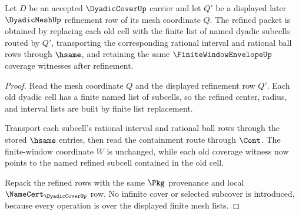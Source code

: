 \begin{theorem}
\label{thm:dyadic-cover-finite-refinement}
Let $D$ be an accepted $\DyadicCoverUp$ carrier and let $Q'$ be a displayed
later $\DyadicMeshUp$ refinement row of its mesh coordinate $Q$. The refined
packet is obtained by replacing each old cell with the finite list of named
dyadic subcells routed by $Q'$, transporting the corresponding rational
interval and rational ball rows through $\hsame$, and retaining the same
$\FiniteWindowEnvelopeUp$ coverage witnesses after refinement.
\end{theorem}
\begin{proof}
Read the mesh coordinate $Q$ and the displayed refinement row $Q'$. Each old
dyadic cell has a finite named list of subcells, so the refined center, radius,
and interval lists are built by finite list replacement.

Transport each subcell's rational interval and rational ball rows through the
stored $\hsame$ entries, then read the containment route through $\Cont$. The
finite-window coordinate $W$ is unchanged, while each old coverage witness now
points to the named refined subcell contained in the old cell.

Repack the refined rows with the same $\Pkg$ provenance and local
$\NameCert_{\DyadicCoverUp}$ row. No infinite cover or selected subcover is
introduced, because every operation is over the displayed finite mesh lists.
\end{proof}

